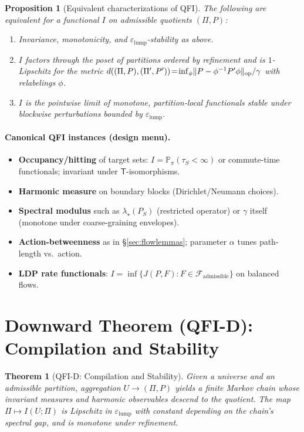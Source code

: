 \documentclass[11pt]{article}
\newcommand{\PP}{\mathbb{P}}
\newcommand{\gap}{\gamma}             %
\newcommand{\1}{\mathbf{1}}
\DeclarePairedDelimiter{\norm}{\lVert}{\rVert}
\newtheorem{prop}{Proposition}
\newtheorem{thm}{Theorem}
\begin{document}
\begin{prop}[Equivalent characterizations of QFI]
The following are equivalent for a functional $I$ on admissible quotients $(\Pi,P)$:
\begin{enumerate}[leftmargin=1.6em,itemsep=0.25em]
\item Invariance, monotonicity, and $\varepsilon_{\mathrm{lump}}$-stability as above.
\item $I$ factors through the poset of partitions ordered by refinement and is $1$-Lipschitz for the metric $d((\Pi,P),(\Pi',P'))\!=\!\inf_\phi\norm{P-\phi^{-1}P'\phi}_{\mathrm{op}}/\gap$ with relabelings $\phi$.
\item $I$ is the pointwise limit of monotone, partition-local functionals stable under \emph{blockwise} perturbations bounded by $\varepsilon_{\mathrm{lump}}$.
\end{enumerate}
\end{prop}

\paragraph{Canonical QFI instances (design menu).}
\begin{itemize}[leftmargin=1.6em,itemsep=0.25em]
\item \textbf{Occupancy/hitting} of target sets: $I\!=\!\PP_\pi(\tau_S<\infty)$ or commute-time functionals; invariant under $\mathsf T$-isomorphisms.
\item \textbf{Harmonic measure} on boundary blocks (Dirichlet/Neumann choices).
\item \textbf{Spectral modulus} such as $\lambda_\star(P_S)$ (restricted operator) or $\gap$ itself (monotone under coarse-graining envelopes).
\item \textbf{Action-betweenness} as in \S\ref{sec:flowlemmas}; parameter $\alpha$ tunes path-length vs.\ action.
\item \textbf{LDP rate functionals}: $I\!=\!\inf\{J(P,F):F\in\mathcal{F}_{\mathrm{admissible}}\}$ on balanced flows\cite{BertiniFaggionatoGabrielli2015}.
\end{itemize}

\section{Downward Theorem (QFI-D): Compilation and Stability}
\begin{thm}[QFI-D: Compilation and Stability]
Given a universe and an admissible partition, aggregation $U\to(\Pi,P)$ yields a finite Markov chain whose invariant measures and harmonic observables descend to the quotient. The map $\Pi\mapsto I(U;\Pi)$ is Lipschitz in $\varepsilon_{\text{lump}}$ with constant depending on the chain's spectral gap, and is monotone under refinement.
\end{thm}
\end{document}
